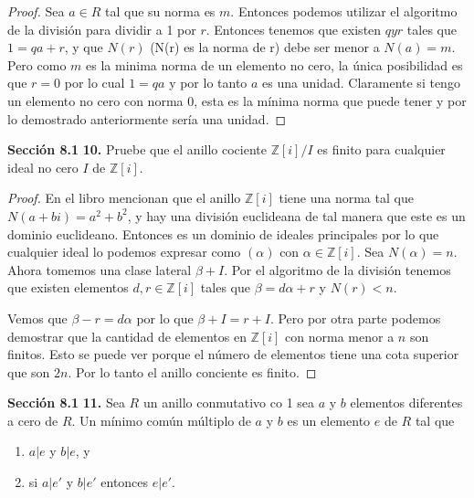 \documentclass[letter,twoside,12pt]{article}
\begin{document}
\begin{proof}
Sea $a \in R$ tal que su norma es $m$. Entonces podemos utilizar el algoritmo de la divisi\'on para dividir a 1 por $r$. Entonces tenemos que existen $q y r$ tales que $1=qa+r$, y que $N(r)$ (N(r) es la norma de r) debe ser menor a $N(a)=m$. Pero como $m$ es la minima norma de un elemento no cero, la \'unica posibilidad es que $r=0$ por lo cual $1=qa$ y por lo tanto $a$ es una unidad. Claramente si tengo un elemento no cero con norma 0, esta es la m\'inima norma que puede tener y por lo demostrado anteriormente ser\'ia una unidad.   
\end{proof}
\newpage 
\textbf{Secci\'on 8.1} \textbf{10.} Pruebe que el anillo cociente $\mathbb{Z}[i]/I$ es finito para cualquier ideal no cero $I$ de $\mathbb{Z}[i]$. 
\begin{proof}
En el libro mencionan que el anillo $\mathbb{Z}[i]$ tiene una norma tal que $N(a+bi)=a^2+b^2$, y hay una divisi\'on euclideana de tal manera que este es un dominio euclideano. Entonces es un dominio de ideales principales por lo que cualquier ideal lo podemos expresar como $(\alpha)$ con $\alpha \in \mathbb{Z}[i]$. Sea $N(\alpha)=n$. Ahora tomemos una clase lateral $\beta + I$. Por el algoritmo de la divisi\'on tenemos que existen elementos $d,r \in \mathbb{Z}[i]$ tales que $\beta = d\alpha+r$ y $N(r)<n$.

Vemos que $\beta-r = d\alpha$ por lo que $\beta + I = r + I$. Pero por otra parte podemos demostrar que la cantidad de elementos en $\mathbb{Z}[i]$ con norma menor a $n$ son finitos. Esto se puede ver porque el n\'umero de elementos tiene una cota superior que son $2n$. Por lo tanto el anillo conciente es finito.
\end{proof}
\newpage 
\textbf{Secci\'on 8.1} \textbf{11.} Sea $R$ un anillo conmutativo co 1 sea $a$ y $b$ elementos diferentes a cero de $R$. Un m\'inimo com\'un m\'ultiplo de $a$ y $b$ es un elemento $e$ de $R$ tal que
\begin{enumerate}[label=\textbf{(\roman*)}]
\item $ a|e $ y $ b|e $, y
\item si $ a|e' $ y $ b|e' $ entonces $ e|e' $.
\end{enumerate}
\end{document}
